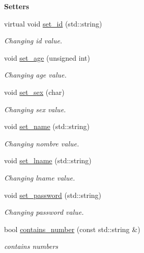 \begin{Indent}{\bf Setters}\par
\begin{DoxyCompactItemize}
\item 
virtual void \hyperlink{class_cuser_ab6a65d60a7a191dc1544454a84f9f0d8}{set\+\_\+id} (std\+::string)
\begin{DoxyCompactList}\small\item\em Changing id value. \end{DoxyCompactList}\item 
void \hyperlink{class_cuser_a21de7d9c58f6128adc959e2c008b7deb}{set\+\_\+age} (unsigned int)
\begin{DoxyCompactList}\small\item\em Changing age value. \end{DoxyCompactList}\item 
void \hyperlink{class_cuser_ae7b40f4c58401451bcbd213b4d956bff}{set\+\_\+sex} (char)
\begin{DoxyCompactList}\small\item\em Changing sex value. \end{DoxyCompactList}\item 
void \hyperlink{class_cuser_a54a15a99fc54cd882e87bb1ba66c3434}{set\+\_\+name} (std\+::string)
\begin{DoxyCompactList}\small\item\em Changing nombre value. \end{DoxyCompactList}\item 
void \hyperlink{class_cuser_a4062d5c81e4aafbb7ac0b9256df66b71}{set\+\_\+lname} (std\+::string)
\begin{DoxyCompactList}\small\item\em Changing lname value. \end{DoxyCompactList}\item 
void \hyperlink{class_cuser_ab1b88a55109edbfb16d6c05fc093fd1e}{set\+\_\+password} (std\+::string)
\begin{DoxyCompactList}\small\item\em Changing password value. \end{DoxyCompactList}\item 
bool \hyperlink{class_cuser_a110db4f47ac17223247019cbb6535fe1}{contains\+\_\+number} (const std\+::string \&)
\begin{DoxyCompactList}\small\item\em contains numbers \end{DoxyCompactList}\end{DoxyCompactItemize}
\end{Indent}
